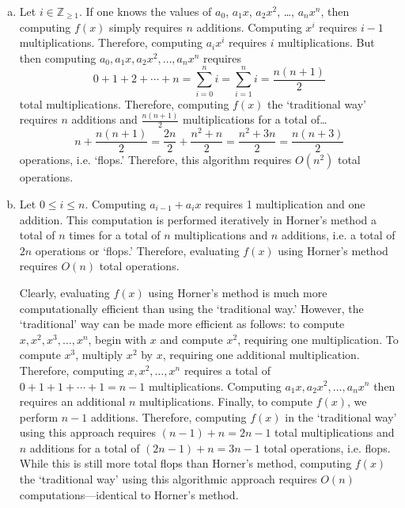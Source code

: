 \documentclass[11pt,letterpaper]{article}
\begin{document}
\sol
\begin{enumerate}[(a)]
\item Let $i \in \mathbb{Z}_{\geq 1}$. If one knows the values of $a_0$, $a_1x$, $a_2x^2$, \dots, $a_n x^n$, then computing $f(x)$ simply requires $n$ additions. Computing $x^i$ requires $i - 1$ multiplications. Therefore, computing $a_i x^i$ requires $i$ multiplications. But then computing $a_0, a_1x, a_2x^2, \ldots, a_nx^n$ requires
	\[
	0 + 1 + 2 + \cdots + n= \sum_{i= 0}^n i= \sum_{i= 1}^n i= \dfrac{n (n +1)}{2}
	\]
total multiplications. Therefore, computing $f(x)$ the `traditional way' requires $n$ additions and $\frac{n(n +1)}{2}$ multiplications for a total of\dots
	\[
	n + \frac{n(n +1)}{2}= \dfrac{2n}{2} + \dfrac{n^2 + n}{2}= \dfrac{n^2 + 3n}{2}= \dfrac{n( n +3)}{2}
	\]
operations, i.e. `flops.' Therefore, this algorithm requires $O(n^2)$ total operations. \pspace

\item Let $0 \leq i \leq n$. Computing $a_{i - 1} + a_i x$ requires 1 multiplication and one addition. This computation is performed iteratively in Horner's method a total of $n$ times for a total of $n$ multiplications and $n$ additions, i.e. a total of $2n$ operations or `flops.' Therefore, evaluating $f(x)$ using Horner's method requires $O(n)$ total operations. 

Clearly, evaluating $f(x)$ using Horner's method is much more computationally efficient than using the `traditional way.' However, the `traditional' way can be made more efficient as follows:  to compute $x, x^2, x^3, \ldots, x^n$, begin with $x$ and compute $x^2$, requiring one multiplication. To compute $x^3$, multiply $x^2$ by $x$, requiring one additional multiplication. Therefore, computing $x, x^2, \ldots, x^n$ requires a total of $0 + 1 + 1 + \cdots + 1= n - 1$ multiplications. Computing $a_1x, a_2x^2, \ldots, a_nx^n$ then requires an additional $n$ multiplications. Finally, to compute $f(x)$, we perform $n - 1$ additions. Therefore, computing $f(x)$ in the `traditional way' using this approach requires $(n - 1) + n= 2n - 1$ total multiplications and $n$ additions for a total of $(2n - 1) + n= 3n - 1$ total operations, i.e. flops. While this is still more total flops than Horner's method, computing $f(x)$ the `traditional way' using this algorithmic approach requires $O(n)$ computations---identical to Horner's method. 
\end{enumerate}
\end{document}
